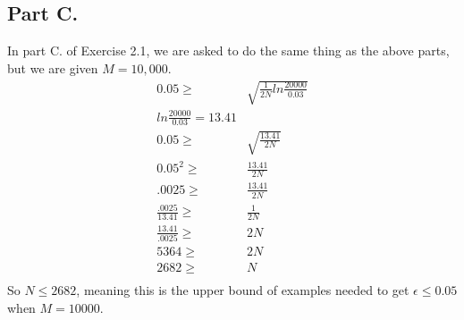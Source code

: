 \documentclass[a4paper]{article}
\begin{document}
\subsection{Part C.}
In part C. of Exercise 2.1, we are asked to do the same thing as the above parts, but we are given $M = 10,000$.
\begin{align}
0.05  \geq & \sqrt{\frac{1}{2N}ln\frac{20000}{0.03}} \\
ln\frac{20000}{0.03} = 13.41 \\
0.05 \geq & \sqrt{\frac{13.41}{2N}}\\
0.05^2 \geq & \frac{13.41}{2N}\\
.0025 \geq & \frac{13.41}{2N}\\
\frac{.0025}{13.41} \geq & \frac{1}{2N}\\
\frac{13.41}{.0025} \geq & 2N\\
5364 \geq & 2N\\
2682 \geq & N\\ 
\end{align}
So $N \leq 2682$, meaning this is the upper bound of examples needed to get $\epsilon \leq 0.05$ when $M=10000$.
\end{document}
